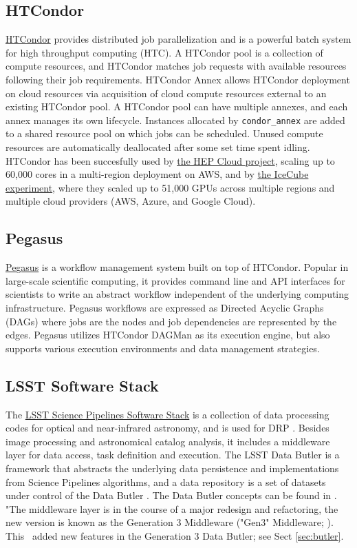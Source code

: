 \subsection{HTCondor}
\href{https://research.cs.wisc.edu/htcondor}{HTCondor}\citep{condor-practice} provides distributed job parallelization and is a powerful batch system for high throughput computing (HTC).
A HTCondor pool is a collection of compute resources, and HTCondor matches job requests with available resources following their job requirements.
HTCondor Annex allows HTCondor deployment on cloud resources via acquisition of cloud compute resources external to an existing HTCondor pool.
A HTCondor pool can have multiple annexes, and each annex manages its own lifecycle.
Instances allocated by \texttt{condor\_annex} are added to a shared resource pool on which jobs can be scheduled.
Unused compute resources are automatically deallocated after some set time spent idling.
HTCondor has been succesfully used by \href{https://aws.amazon.com/blogs/aws/experiment-that-discovered-the-higgs-boson-uses-aws-to-probe-nature}{the HEP Cloud project}, scaling up to 60,000 cores in a multi-region deployment on AWS, and by \href{https://www.linkedin.com/pulse/using-50k-gpus-across-multiple-clouds-icecube-science-igor-sfiligoi}{the IceCube experiment}, where they scaled up to 51,000 GPUs across multiple regions and multiple cloud providers (AWS, Azure, and Google Cloud).
\subsection{Pegasus}
\href{https://pegasus.isi.edu/}{Pegasus}\citep{deelman-fgcs-2015} is a workflow management system built on top of HTCondor.
Popular in large-scale scientific computing, it provides command line and API interfaces for scientists to write an abstract workflow independent of the underlying computing infrastructure.
Pegasus workflows are expressed as Directed Acyclic Graphs (DAGs) where jobs are the nodes and job dependencies are represented by the edges.
Pegasus utilizes HTCondor DAGMan as its execution engine, but also supports various execution environments and data management strategies.
\subsection{LSST Software Stack}
The \href{https://pipelines.lsst.io/}{LSST Science Pipelines Software Stack} is a collection of data processing codes for optical and near-infrared astronomy, and is used for DRP \citep{2018PASJ...70S...5B}.
Besides image processing and astronomical catalog analysis, it includes a middleware layer for data access, task definition and execution.
The LSST Data Butler is a framework that abstracts the underlying data persistence and implementations from Science Pipelines algorithms, and a data repository is a set of datasets under control of the Data Butler \citep{2018arXiv181208085J}.
The Data Butler concepts can be found in .
"The middleware layer is in the course of a major redesign and refactoring, the new version is known as the Generation 3 Middleware ("Gen3" Middleware; ).
This \poc~added new features in the Generation 3 Data Butler; see Sect \ref{sec:butler}.


